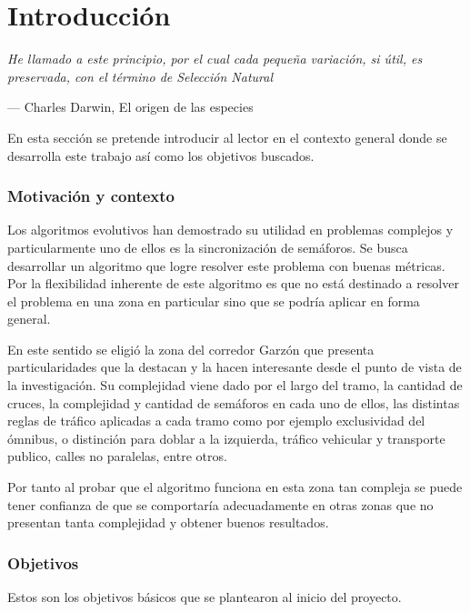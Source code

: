 \chapter{Introducción}
\epigraph{ \textit{He llamado a este principio, por el cual cada pequeña variación, si útil, es preservada, con el término de Selección Natural}}{--- Charles Darwin, El origen de las especies}

En esta sección se pretende introducir al lector en el contexto general donde se desarrolla este trabajo así como los objetivos buscados.

\subsection{Motivación y contexto}

Los algoritmos evolutivos han demostrado su utilidad en problemas complejos y particularmente uno de ellos es la sincronización de semáforos. Se busca desarrollar un algoritmo que logre resolver este problema con buenas métricas.
Por la flexibilidad inherente de este algoritmo es que no está destinado a resolver el problema en una zona en particular sino que se podría aplicar en forma general.

En este sentido se eligió la zona del corredor Garzón que presenta particularidades que la destacan y la hacen interesante desde el punto de vista de la investigación. Su complejidad viene dado por el largo del tramo, la cantidad de cruces, la complejidad y cantidad de semáforos en cada uno de ellos, las distintas reglas de tráfico aplicadas a cada tramo como por ejemplo exclusividad del ómnibus, o distinción para doblar a la izquierda, tráfico vehicular y transporte publico, calles no paralelas, entre otros.

Por tanto al probar que el algoritmo funciona en esta zona tan compleja se puede tener confianza de que se comportaría adecuadamente en otras zonas que no presentan tanta complejidad y obtener buenos resultados.



\newpage

\subsection{Objetivos}

Estos son los objetivos básicos que se plantearon al inicio del  proyecto.

